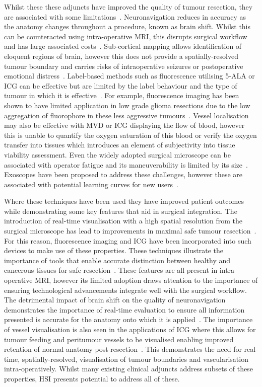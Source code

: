Whilst these these adjuncts have improved the quality of tumour resection, they are associated with some limitations~\citep{Chanbour2022}. Neuronavigation reduces in accuracy as the anatomy changes throughout a procedure, known as brain shift. Whilst this can be counteracted using intra-operative MRI, this disrupts surgical workflow and has large associated costs~\citep{Chanbour2022}. Sub-cortical mapping allows identification of eloquent regions of brain, however this does not provide a spatially-resolved tumour boundary and carries risks of intraoperative seizures or postoperative emotional distress~\citep{Chanbour2022}. Label-based methods such as fluorescence utilising 5-ALA or ICG can be effective but are limited by the label behaviour and the type of tumour in which it is effective~\citep{Chanbour2022}. For example, fluorescence imaging has been shown to have limited application in low grade glioma resections due to the low aggregation of fluorophore in these less aggressive tumours~\citep{Belykh2023, Kiesel2021, Jaber2019}. Vessel localisation may also be effective with MVD or ICG displaying the flow of blood, however this is unable to quantify the oxygen saturation of this blood or verify the oxygen transfer into tissues which introduces an element of subjectivity into tissue viability assessment. Even the widely adopted surgical microscope can be associated with operator fatigue and its maneuverability is limited by its size~\citep{Alamer2023}. Exoscopes have been proposed to address these challenges, however these are associated with potential learning curves for new users~\citep{Alamer2023}.

Where these techniques have been used they have improved patient outcomes while demonstrating some key features that aid in surgical integration. The introduction of real-time visualisation with a high spatial resolution from the surgical microscope has lead to improvements in maximal safe tumour resection~\citep{Alamer2023}. For this reason, fluorescence imaging and ICG have been incorporated into such devices to make use of these properties. These techniques illustrate the importance of tools that enable accurate distinction between healthy and cancerous tissues for safe resection~\citep{Belykh2023}. These features are all present in intra-operative MRI, however its limited adoption draws attention to the importance of ensuring technological advancements integrate well with the surgical workflow. The detrimental impact of brain shift on the quality of neuronavigation demonstrates the importance of real-time evaluation to ensure all information presented is accurate for the anatomy onto which it is applied~\citep{Alamer2023}. The importance of vessel visualisation is also seen in the applications of ICG where this allows for tumour feeding and peritumour vessels to be visualised enabling improved retention of normal anatomy post-resection~\citep{Catapano2018}. This demonstrates the need for real-time, spatially-resolved, visualisation of tumour boundaries and vascularisation intra-operatively. Whilst many existing clinical adjuncts address subsets of these properties, HSI presents potential to address all of these.  

